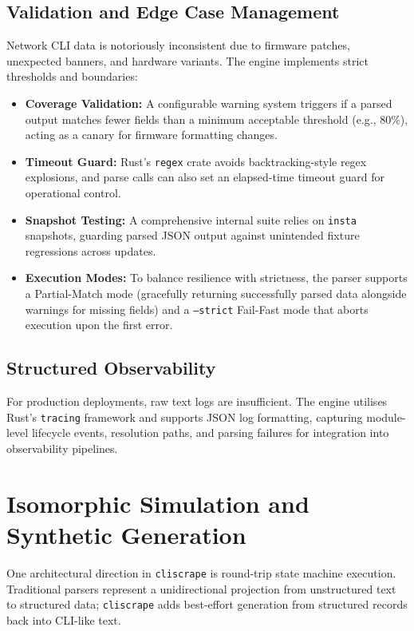 \documentclass[a4paper,10pt]{article}
\begin{document}
\subsection{Validation and Edge Case Management}
Network CLI data is notoriously inconsistent due to firmware patches, unexpected banners, and hardware variants. The engine implements strict thresholds and boundaries:
\begin{itemize}
    \item \textbf{Coverage Validation:} A configurable warning system triggers if a parsed output matches fewer fields than a minimum acceptable threshold (e.g., 80\%), acting as a canary for firmware formatting changes.
    \item \textbf{Timeout Guard:} Rust's \texttt{regex} crate avoids backtracking-style regex explosions, and parse calls can also set an elapsed-time timeout guard for operational control.
    \item \textbf{Snapshot Testing:} A comprehensive internal suite relies on \texttt{insta} snapshots, guarding parsed \ac{JSON} output against unintended fixture regressions across updates.
    \item \textbf{Execution Modes:} To balance resilience with strictness, the parser supports a Partial-Match mode (gracefully returning successfully parsed data alongside warnings for missing fields) and a \texttt{--strict} Fail-Fast mode that aborts execution upon the first error.
\end{itemize}

\subsection{Structured Observability}
For production deployments, raw text logs are insufficient. The engine utilises Rust's \texttt{tracing} framework and supports JSON log formatting, capturing module-level lifecycle events, resolution paths, and parsing failures for integration into observability pipelines.

\section{Isomorphic Simulation and Synthetic Generation}
\label{sec:simulation}

One architectural direction in \texttt{cliscrape} is round-trip state machine execution. Traditional parsers represent a unidirectional projection from unstructured text to structured data; \texttt{cliscrape} adds best-effort generation from structured records back into CLI-like text.
\end{document}
